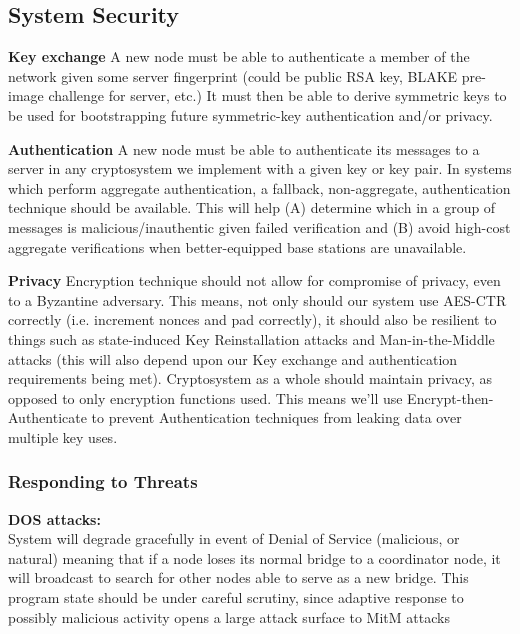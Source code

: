 \documentclass[tikz,a4paper,titlepage]{article}
\begin{document}
\subsection{System Security} %

\textbf{Key exchange}
    A new node must be able to authenticate a member of the network given some server fingerprint (could be public RSA key, BLAKE pre-image challenge for server, etc.) It must then be able to derive symmetric keys to be used for bootstrapping future symmetric-key authentication and/or privacy.
    
\textbf{Authentication}
    A new node must be able to authenticate its messages to a server in any cryptosystem we implement with a given key or key pair. In systems which perform aggregate authentication, a fallback, non-aggregate, authentication technique should be available. This will help (A) determine which in a group of messages is malicious/inauthentic given failed verification and (B) avoid high-cost aggregate verifications when better-equipped base stations are unavailable.
    
\textbf{Privacy}
    Encryption technique should not allow for compromise of privacy, even to a Byzantine adversary. This means, not only should our system use AES-CTR correctly (i.e. increment nonces and pad correctly), it should also be resilient to things such as state-induced Key Reinstallation attacks and Man-in-the-Middle attacks (this will also depend upon our Key exchange and authentication requirements being met). Cryptosystem as a whole should maintain privacy, as opposed to only encryption functions used. This means we'll use Encrypt-then-Authenticate to prevent Authentication techniques from leaking data over multiple key uses.
    
\subsubsection{Responding to Threats} %

{\bfseries{DOS attacks:}}\\
System will degrade gracefully in event of Denial of Service (malicious, or natural) meaning that if a node loses its normal bridge to a coordinator node, it will broadcast to search for other nodes able to serve as a new bridge. This program state should be under careful scrutiny, since adaptive response to possibly malicious activity opens a large attack surface to MitM attacks \\
\end{document}
